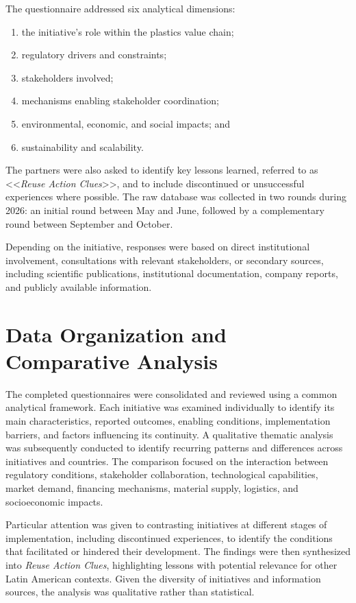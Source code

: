 \documentclass[
  12pt,
  oneside]{book}
\providecommand{\tightlist}{%
  \setlength{\itemsep}{0pt}\setlength{\parskip}{0pt}}
\begin{document}
The questionnaire addressed six analytical dimensions:

\begin{enumerate}
\def\labelenumi{(\roman{enumi})}
\tightlist
\item
  the initiative's role within the plastics value chain;
\item
  regulatory drivers and constraints;
\item
  stakeholders involved;
\item
  mechanisms enabling stakeholder coordination;
\item
  environmental, economic, and social impacts; and
\item
  sustainability and scalability.
\end{enumerate}

The partners were also asked to identify key lessons learned, referred
to as \textless\textless{}\emph{Reuse Action
Clues}\textgreater\textgreater, and to include discontinued or
unsuccessful experiences where possible. The raw database was collected
in two rounds during 2026: an initial round between May and June,
followed by a complementary round between September and October.

Depending on the initiative, responses were based on direct
institutional involvement, consultations with relevant stakeholders, or
secondary sources, including scientific publications, institutional
documentation, company reports, and publicly available information.

\section{Data Organization and Comparative
Analysis}\label{data-organization-and-comparative-analysis}

The completed questionnaires were consolidated and reviewed using a
common analytical framework. Each initiative was examined individually
to identify its main characteristics, reported outcomes, enabling
conditions, implementation barriers, and factors influencing its
continuity. A qualitative thematic analysis was subsequently conducted
to identify recurring patterns and differences across initiatives and
countries. The comparison focused on the interaction between regulatory
conditions, stakeholder collaboration, technological capabilities,
market demand, financing mechanisms, material supply, logistics, and
socioeconomic impacts.

Particular attention was given to contrasting initiatives at different
stages of implementation, including discontinued experiences, to
identify the conditions that facilitated or hindered their development.
The findings were then synthesized into \emph{Reuse Action Clues},
highlighting lessons with potential relevance for other Latin American
contexts. Given the diversity of initiatives and information sources,
the analysis was qualitative rather than statistical.
\end{document}
